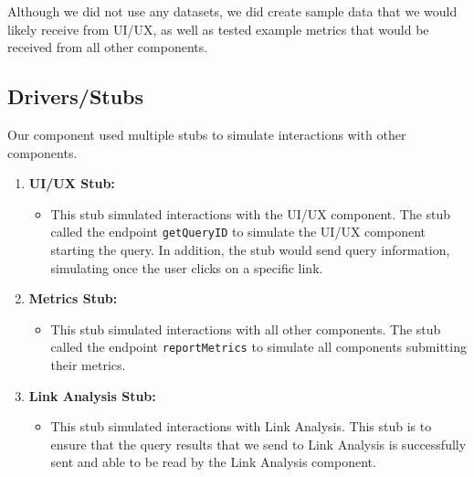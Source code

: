 Although we did not use any datasets, we did create sample data that we would 
likely receive from UI/UX, as well as tested example metrics that would be 
received from all other components. 

\subsection*{Drivers/Stubs}

Our component used multiple stubs to simulate interactions with other 
components.
\begin{enumerate}
    \item \textbf{UI/UX Stub:} 
    \begin{itemize}
        \item This stub simulated interactions with the UI/UX component. The
        stub called the endpoint \texttt{getQueryID} to simulate the UI/UX 
        component starting the query. In addition, the stub would send query 
        information, simulating once the user clicks on a specific link.
    \end{itemize}
    \item \textbf{Metrics Stub:} 
    \begin{itemize}
        \item This stub simulated interactions with all other components. The
        stub called the endpoint \texttt{reportMetrics} to simulate all 
        components submitting their metrics. 
    \end{itemize}
    \item \textbf{Link Analysis Stub:} 
    \begin{itemize}
        \item This stub simulated interactions with Link Analysis. This stub is 
        to ensure that the query results that we send to Link Analysis is 
        successfully sent and able to be read by the Link Analysis component.
    \end{itemize}
\end{enumerate}

